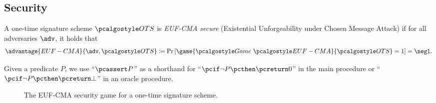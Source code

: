 \subsection{Security}

\begin{definition}\label{def:euf-cma-ot}
    A one-time signature scheme $\algo{OTS}$ is \emph{EUF-CMA secure} (Existential Unforgeability under Chosen Message Attack) if for all \ppt adversaries $\adv$, it holds that
    \[
    \advantage{EUF-CMA}{\adv, \algo{OTS}} \defeq \pr{\game{\Game~\algo{EUF-CMA}}{\algo{OTS}} = 1} = \negl.
    \]
\end{definition}

\begin{remark}
Given a predicate $P$, we use ``$\pcassert P$'' as a shorthand for ``$\pcif \neg P \pcthen \pcreturn 0$'' in the main procedure or ``$\pcif \neg P \pcthen \pcreturn \bot$'' in an oracle procedure.
\end{remark}

\begin{figure}[tbh]
 \begin{tcolorbox}%
  \begin{pchstack}[center]
   \pchspace
  \end{pchstack}
 \end{tcolorbox}
 \caption{The EUF-CMA security game for a one-time signature scheme.}
 \label{fig:euf-cma-ots}
\end{figure}

